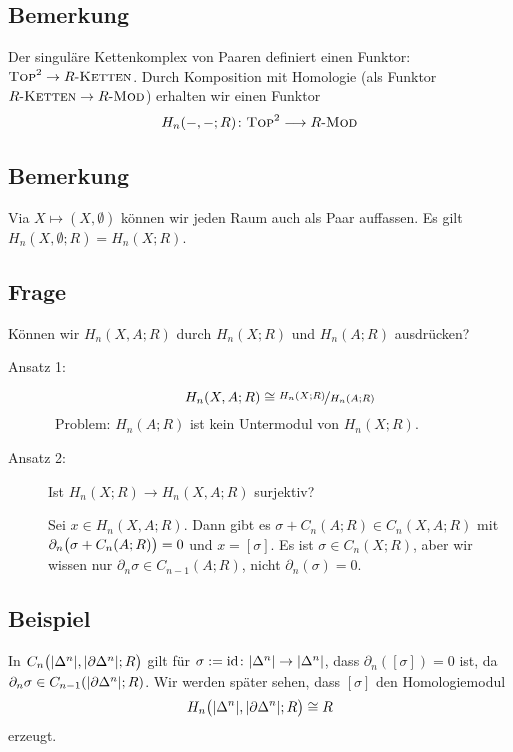 \subsection[Definition: Der singuläre Kettenkomplex von Paaren definiert einen Funktor]{Bemerkung} %
\label{sub:83}
Der singuläre Kettenkomplex von Paaren definiert einen Funktor: $\TOP^2 \to R\text{-}\textsc{Ketten}$. Durch Komposition mit Homologie (als Funktor 
$R\text{-}\textsc{Ketten} \to R\text{-}\MOD$) erhalten wir einen Funktor
\[
	H_n(-,-;R) \colon \TOP^2 \longrightarrow R\text{-}\MOD
\]

\subsection[Bemerkung: Topologische Räume als Paar auffassen]{Bemerkung} %
\label{sub:84}
Via $X \mapsto (X,\emptyset)$ können wir jeden Raum auch als Paar auffassen. Es gilt $H_n(X,\emptyset;R) = H_n(X;R)$.

\subsection[Frage: Können wir $H_n(X,A;R)$ durch $H_n(X;R)$ und $H_n(A;R)$ ausdrücken?]{Frage} %
\label{sub:85}
Können wir $H_n(X,A;R)$ durch $H_n(X;R)$ und $H_n(A;R)$ ausdrücken? 
\begin{description}
	\item[Ansatz 1:] 
	\[
		H_n(X,A;R) \cong \nicefrac{H_n(X;R)}{H_n(A;R)}
	\]
	\ifxetexorluatex \faWarningSign \fi \, Problem: $H_n(A;R)$ ist kein Untermodul von $H_n(X;R)$.
	\item[Ansatz 2:] Ist $H_n(X;R) \to H_n(X,A;R)$ surjektiv?
	
	Sei $x \in H_n(X,A;R)$. Dann gibt es $\sigma + C_n(A;R) \in C_n(X,A;R)$ mit $\partial_n \enbrace[\big]{\sigma + C_n(A;R)} = 0$ und $x= [\sigma]$. Es ist 
	$\sigma \in C_n(X;R)$, aber wir wissen nur $\partial_n \sigma \in C_{n-1}(A;R)$, nicht $\partial_n(\sigma)= 0$. \hfill \ifxetexorluatex {\large \faMeh} \fi
\end{description}

\subsection[Beispiel: Homologie des Paares $(\abs*{\Delta^n}, \abs*{\partial \Delta^n})$]{Beispiel} %
\label{sub:86}
In $C_n \enbrace[\big]{\abs*{\Delta^n}, \abs*{\partial \Delta^n};R}$ gilt für $\sigma := \id \colon \abs*{\Delta^n} \to \abs*{\Delta^n}$, dass $\partial_n([\sigma])=0$ ist, da 
$\partial_n \sigma \in C_{n-1} \enbrace*{\abs*{\partial \Delta^n};R}$. Wir werden später sehen, dass $[\sigma]$ den Homologiemodul
\[
	H_n \enbrace[\big]{\abs*{\Delta^n}, \abs*{\partial \Delta^n};R  } \cong R 
\]
erzeugt.

